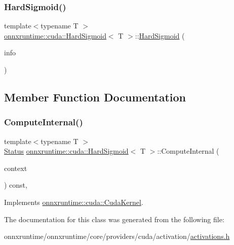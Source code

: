 \subsubsection{\texorpdfstring{Hard\+Sigmoid()}{HardSigmoid()}}
{\footnotesize\ttfamily template$<$typename T $>$ \\
\mbox{\hyperlink{classonnxruntime_1_1cuda_1_1HardSigmoid}{onnxruntime\+::cuda\+::\+Hard\+Sigmoid}}$<$ T $>$\+::\mbox{\hyperlink{classonnxruntime_1_1cuda_1_1HardSigmoid}{Hard\+Sigmoid}} (\begin{DoxyParamCaption}\item[{const \mbox{\hyperlink{classonnxruntime_1_1OpKernelInfo}{Op\+Kernel\+Info}} \&}]{info }\end{DoxyParamCaption})\hspace{0.3cm}{\ttfamily [inline]}}



\subsection{Member Function Documentation}
\mbox{\label{classonnxruntime_1_1cuda_1_1HardSigmoid_a7b94a8b92e87ff5eac2d37561b13bdc9}} 
\subsubsection{\texorpdfstring{Compute\+Internal()}{ComputeInternal()}}
{\footnotesize\ttfamily template$<$typename T $>$ \\
\mbox{\hyperlink{classonnxruntime_1_1common_1_1Status}{Status}} \mbox{\hyperlink{classonnxruntime_1_1cuda_1_1HardSigmoid}{onnxruntime\+::cuda\+::\+Hard\+Sigmoid}}$<$ T $>$\+::Compute\+Internal (\begin{DoxyParamCaption}\item[{\mbox{\hyperlink{classonnxruntime_1_1OpKernelContext}{Op\+Kernel\+Context}} $\ast$}]{context }\end{DoxyParamCaption}) const\hspace{0.3cm}{\ttfamily [override]}, {\ttfamily [virtual]}}



Implements \mbox{\hyperlink{classonnxruntime_1_1cuda_1_1CudaKernel_aca7af04ae448017d6023d30bba231ebb}{onnxruntime\+::cuda\+::\+Cuda\+Kernel}}.



The documentation for this class was generated from the following file\+:\begin{DoxyCompactItemize}
\item 
onnxruntime/onnxruntime/core/providers/cuda/activation/\mbox{\hyperlink{cuda_2activation_2activations_8h}{activations.\+h}}\end{DoxyCompactItemize}
